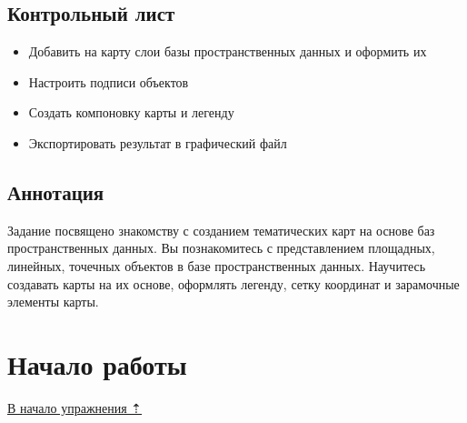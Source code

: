 \documentclass[12pt,]{book}
\providecommand{\tightlist}{%
  \setlength{\itemsep}{0pt}\setlength{\parskip}{0pt}}
\begin{document}
\hypertarget{map-design-general-control}{%
\subsection{Контрольный лист}\label{map-design-general-control}}

\begin{itemize}
\tightlist
\item
  Добавить на карту слои базы пространственных данных и оформить их
\item
  Настроить подписи объектов
\item
  Создать компоновку карты и легенду
\item
  Экспортировать результат в графический файл
\end{itemize}

\hypertarget{map-design-general-annotation}{%
\subsection{Аннотация}\label{map-design-general-annotation}}

Задание посвящено знакомству с созданием тематических карт на основе баз пространственных данных. Вы познакомитесь с представлением площадных, линейных, точечных объектов в базе пространственных данных. Научитесь создавать карты на их основе, оформлять легенду, сетку координат и зарамочные элементы карты.

\hypertarget{map-design-general-begin}{%
\section{Начало работы}\label{map-design-general-begin}}

\protect\hyperlink{map-design-general}{В начало упражнения ⇡}
\end{document}
